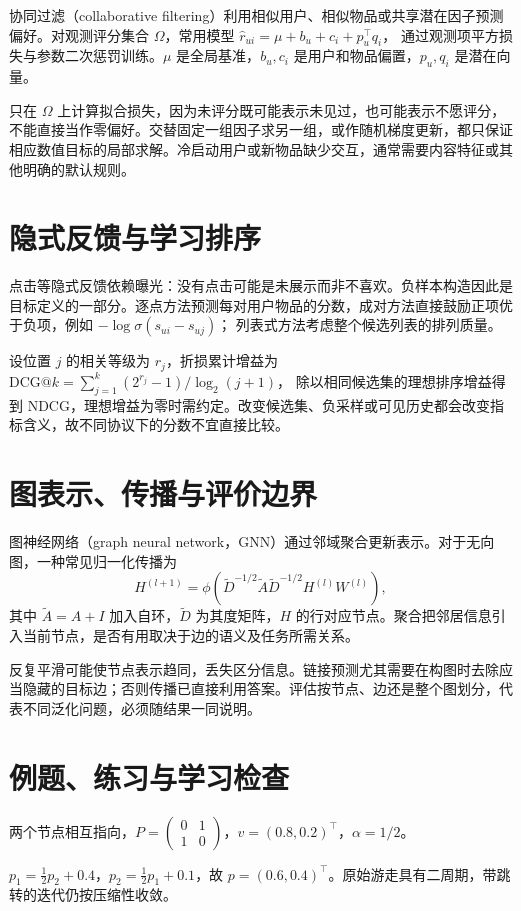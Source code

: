 \documentclass[UTF8,12pt,a4paper,fontset=fandol]{ctexbook}
\begin{document}
协同过滤（collaborative filtering）利用相似用户、相似物品或共享潜在因子预测偏好。对观测评分集合 $\Omega$，常用模型
$\widehat r_{ui}=\mu+b_u+c_i+p_u^\top q_i$，
通过观测项平方损失与参数二次惩罚训练。$\mu$ 是全局基准，$b_u,c_i$ 是用户和物品偏置，$p_u,q_i$ 是潜在向量。

只在 $\Omega$ 上计算拟合损失，因为未评分既可能表示未见过，也可能表示不愿评分，不能直接当作零偏好。交替固定一组因子求另一组，或作随机梯度更新，都只保证相应数值目标的局部求解。冷启动用户或新物品缺少交互，通常需要内容特征或其他明确的默认规则。

\section{隐式反馈与学习排序}

点击等隐式反馈依赖曝光：没有点击可能是未展示而非不喜欢。负样本构造因此是目标定义的一部分。逐点方法预测每对用户物品的分数，成对方法直接鼓励正项优于负项，例如
$-\log\sigma(s_{ui}-s_{uj})$；
列表式方法考虑整个候选列表的排列质量。

设位置 $j$ 的相关等级为 $r_j$，折损累计增益为
$\mathrm{DCG}@k=\sum_{j=1}^k(2^{r_j}-1)/\log_2(j+1)$，
除以相同候选集的理想排序增益得到 NDCG，理想增益为零时需约定。改变候选集、负采样或可见历史都会改变指标含义，故不同协议下的分数不宜直接比较。

\section{图表示、传播与评价边界}

图神经网络（graph neural network，GNN）通过邻域聚合更新表示。对于无向图，一种常见归一化传播为
\begin{equation}
 H^{(l+1)}=\phi(\widetilde D^{-1/2}\widetilde A\widetilde D^{-1/2}H^{(l)}W^{(l)}),
 \label{eq:ml-graph-propagation}
\end{equation}
其中 $\widetilde A=A+I$ 加入自环，$\widetilde D$ 为其度矩阵，$H$ 的行对应节点。聚合把邻居信息引入当前节点，是否有用取决于边的语义及任务所需关系。

反复平滑可能使节点表示趋同，丢失区分信息。链接预测尤其需要在构图时去除应当隐藏的目标边；否则传播已直接利用答案。评估按节点、边还是整个图划分，代表不同泛化问题，必须随结果一同说明。

\section{例题、练习与学习检查}

\begin{example}
两个节点相互指向，$P=\left(\begin{smallmatrix}0&1\\1&0\end{smallmatrix}\right)$，$v=(0.8,0.2)^\top$，$\alpha=1/2$。
\end{example}
\begin{solve}
$p_1=\frac12p_2+0.4$，$p_2=\frac12p_1+0.1$，故 $p=(0.6,0.4)^\top$。原始游走具有二周期，带跳转的迭代仍按压缩性收敛。
\end{solve}
\end{document}
